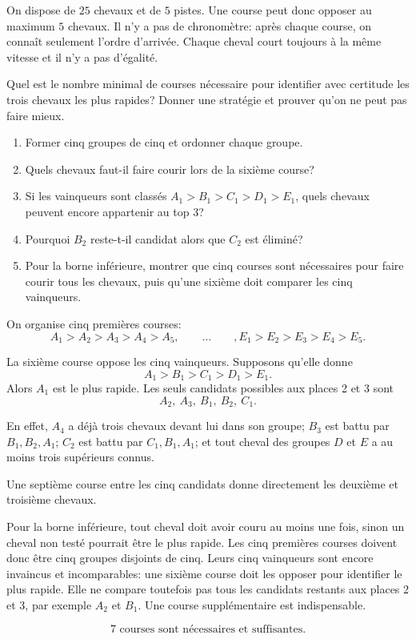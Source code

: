 \documentclass[11pt,a4paper]{article}
\begin{document}

\begin{statementbox}
On dispose de $25$ chevaux et de $5$ pistes. Une course peut donc opposer au
maximum $5$ chevaux. Il n'y a pas de chronomètre: après chaque course, on
connaît seulement l'ordre d'arrivée. Chaque cheval court toujours à la même
vitesse et il n'y a pas d'égalité.

Quel est le nombre minimal de courses nécessaire pour identifier avec
certitude les trois chevaux les plus rapides? Donner une stratégie et prouver
qu'on ne peut pas faire mieux.
\end{statementbox}

\begin{hintsbox}
\begin{enumerate}
  \item Former cinq groupes de cinq et ordonner chaque groupe.
  \item Quels chevaux faut-il faire courir lors de la sixième course?
  \item Si les vainqueurs sont classés $A_1>B_1>C_1>D_1>E_1$, quels chevaux
  peuvent encore appartenir au top 3?
  \item Pourquoi $B_2$ reste-t-il candidat alors que $C_2$ est éliminé?
  \item Pour la borne inférieure, montrer que cinq courses sont nécessaires
  pour faire courir tous les chevaux, puis qu'une sixième doit comparer les
  cinq vainqueurs.
\end{enumerate}
\end{hintsbox}

\correction

On organise cinq premières courses:
\[
A_1>A_2>A_3>A_4>A_5,
\qquad\ldots\qquad,
E_1>E_2>E_3>E_4>E_5.
\]

La sixième course oppose les cinq vainqueurs. Supposons qu'elle donne
\[
A_1>B_1>C_1>D_1>E_1.
\]
Alors $A_1$ est le plus rapide. Les seuls candidats possibles aux places 2 et
3 sont
\[
A_2,\ A_3,\ B_1,\ B_2,\ C_1.
\]

En effet, $A_4$ a déjà trois chevaux devant lui dans son groupe; $B_3$ est
battu par $B_1,B_2,A_1$; $C_2$ est battu par $C_1,B_1,A_1$; et tout cheval
des groupes $D$ et $E$ a au moins trois supérieurs connus.

Une septième course entre les cinq candidats donne directement les deuxième
et troisième chevaux.

Pour la borne inférieure, tout cheval doit avoir couru au moins une fois,
sinon un cheval non testé pourrait être le plus rapide. Les cinq premières
courses doivent donc être cinq groupes disjoints de cinq. Leurs cinq vainqueurs
sont encore invaincus et incomparables: une sixième course doit les opposer
pour identifier le plus rapide. Elle ne compare toutefois pas tous les
candidats restants aux places 2 et 3, par exemple $A_2$ et $B_1$. Une course
supplémentaire est indispensable.

\begin{resultbox}
\[
\boxed{7\text{ courses sont nécessaires et suffisantes}.}
\]
\end{resultbox}
\end{document}

